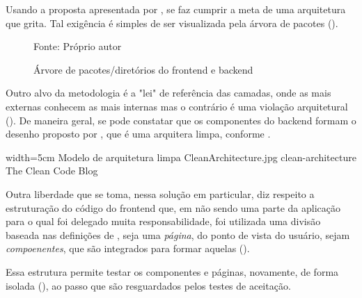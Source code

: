   Usando a proposta apresentada por , se faz cumprir a meta de uma arquitetura que grita. Tal exigência é simples de ser visualizada pela árvora de pacotes ().

  \begin{figure}[h]
    \centering
    \caption{Árvore de pacotes/diretórios do frontend e backend}
    Fonte: Próprio autor
    \label{fig:arvores-de-pacotes-diretorios}
  \end{figure}

  Outro alvo da metodologia é a "lei" de referência das camadas, onde as mais externas conhecem as mais internas mas o contrário é uma violação arquitetural (). De maneira geral, se pode constatar que os componentes do backend formam o desenho proposto por , que é uma arquitera limpa, conforme .

  \imagem
    {width=5cm}
    {Modelo de arquitetura limpa}
    {CleanArchitecture.jpg}
    {clean-architecture}
    {The Clean Code Blog\footnotemark}

  Outra liberdade que se toma, nessa solução em particular, diz respeito a estruturação do código do frontend que, em não sendo uma parte da aplicação para o qual foi delegado muita responsabilidade, foi utilizada uma divisão baseada nas definições de , seja uma \emph{página}, do ponto de vista do usuário, sejam \emph{compoenentes}, que são integrados para formar aquelas ().

  Essa estrutura permite testar os componentes e páginas, novamente, de forma isolada (), ao passo que são resguardados pelos testes de aceitação.


